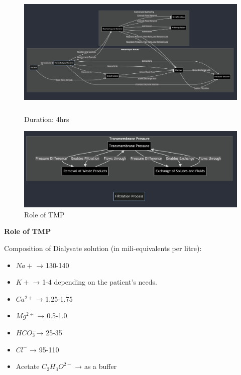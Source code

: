 \documentclass[
  11pt,
  letterpaper,
  DIV=11,
  numbers=noendperiod]{scrreprt}
\providecommand{\tightlist}{%
  \setlength{\itemsep}{0pt}\setlength{\parskip}{0pt}}\usepackage{longtable,booktabs,array}
\begin{document}
\begin{figure}[H]

{\centering \includegraphics[width=5.44792in,height=2.48958in]{Beyond the Sterile Walls e0cff5645ec24545a8c247940fff8e84/Untitled 4.png}

}

\caption{Duration: 4hrs}

\end{figure}%
\begin{figure}[H]

{\centering \includegraphics[width=5.51042in,height=\textheight]{Beyond the Sterile Walls e0cff5645ec24545a8c247940fff8e84/Untitled 5.png}

}

\caption{Role of TMP}

\end{figure}%

\textbf{Role of TMP}

Composition of Dialysate solution (in mili-equivalents per litre):

\begin{itemize}
\tightlist
\item
  \(Na+\) → 130-140
\item
  \(K+\) → 1-4 depending on the patient's needs.
\item
  \(Ca^{2+}\) → 1.25-1.75
\item
  \(Mg^{2+}\) → 0.5-1.0
\item
  \(HCO_3^{-}\)→ 25-35
\item
  \(Cl^-\) → 95-110
\item
  Acetate \(C_2H_3O^{2-}\) → as a buffer
\end{itemize}
\end{document}

